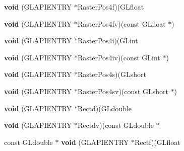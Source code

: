 \begin{DoxyCompactItemize}
\item 
\mbox{\label{struct_____g_ldispatch_table_rec_acfd6925329baca6fc1632904829c9fd7}} 
{\bfseries void} (G\+L\+A\+P\+I\+E\+N\+T\+RY $\ast$Raster\+Pos4f)(G\+Lfloat
\item 
\mbox{\label{struct_____g_ldispatch_table_rec_a32bb81c00a33f0182e7a8c38f6faa997}} 
{\bfseries void} (G\+L\+A\+P\+I\+E\+N\+T\+RY $\ast$Raster\+Pos4fv)(const G\+Lfloat $\ast$)
\item 
\mbox{\label{struct_____g_ldispatch_table_rec_a48d6a5bce2c56fed4cccb8b94466c89e}} 
{\bfseries void} (G\+L\+A\+P\+I\+E\+N\+T\+RY $\ast$Raster\+Pos4i)(G\+Lint
\item 
\mbox{\label{struct_____g_ldispatch_table_rec_a1fbe4d0c003180f10180b0c08faa5259}} 
{\bfseries void} (G\+L\+A\+P\+I\+E\+N\+T\+RY $\ast$Raster\+Pos4iv)(const G\+Lint $\ast$)
\item 
\mbox{\label{struct_____g_ldispatch_table_rec_a82f80f2aba0682bae3f6f1e2da107db3}} 
{\bfseries void} (G\+L\+A\+P\+I\+E\+N\+T\+RY $\ast$Raster\+Pos4s)(G\+Lshort
\item 
\mbox{\label{struct_____g_ldispatch_table_rec_a27f08a4a3438fef42ec455bb444d2093}} 
{\bfseries void} (G\+L\+A\+P\+I\+E\+N\+T\+RY $\ast$Raster\+Pos4sv)(const G\+Lshort $\ast$)
\item 
\mbox{\label{struct_____g_ldispatch_table_rec_a1165ec5bf2ee4a5cd6c7263f11a64934}} 
{\bfseries void} (G\+L\+A\+P\+I\+E\+N\+T\+RY $\ast$Rectd)(G\+Ldouble
\item 
\mbox{\label{struct_____g_ldispatch_table_rec_a60303085687d31499278c2bd45230d64}} 
{\bfseries void} (G\+L\+A\+P\+I\+E\+N\+T\+RY $\ast$Rectdv)(const G\+Ldouble $\ast$
\item 
\mbox{\label{struct_____g_ldispatch_table_rec_ae8675633664172ae93987ff8c0ec0495}} 
const G\+Ldouble $\ast$ {\bfseries void} (G\+L\+A\+P\+I\+E\+N\+T\+RY $\ast$Rectf)(G\+Lfloat

\end{DoxyCompactItemize}
